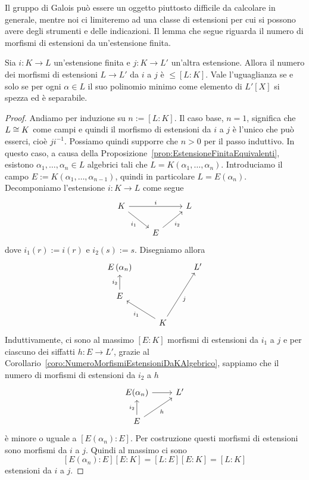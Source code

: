 Il gruppo di Galois può essere un oggetto piuttosto difficile da calcolare in generale, mentre noi ci limiteremo ad una classe di estensioni per cui si possono avere degli strumenti e delle indicazioni. Il lemma che segue riguarda il numero di morfismi di estensioni da un'estensione finita.

\begin{lemm}
Sia $i : K \to L$ un'estensione finita e $j : K \to L'$ un'altra estensione. Allora il numero dei morfismi di estensioni $L \to L'$ da $i$ a $j$ è $\le [L:K]$. Vale l'uguaglianza se e solo se per ogni $\alpha \in L$ il suo polinomio minimo come elemento di $L'[X]$ si spezza ed è separabile.
\end{lemm}

\begin{proof}
Andiamo per induzione su $n := [L:K]$. Il caso base, $n = 1$, significa che $L \cong K$ come campi e quindi il morfismo di estensioni da $i$ a $j$ è l'unico che può esserci, cioè $ji^{-1}$. Possiamo quindi supporre che $n > 0$ per il passo induttivo. In questo caso, a causa della Proposizione~\ref{prop:EstensioneFinitaEquivalenti}, esistono $\alpha_1, \dots{}, \alpha_n \in L$ algebrici tali che $L = K\left(\alpha_1, \dots{}, \alpha_n\right)$. Introduciamo il campo $E := K\left(\alpha_1, \dots{}, \alpha_{n-1}\right)$, quindi in particolare $L = E(\alpha_n)$. Decomponiamo l'estensione $i : K \to L$ come segue
\[\begin{tikzcd}
K \ar["i", rr] \ar["{i_1}", dr, swap] & & L \\
& E \ar["{i_2}", ur, swap]
\end{tikzcd}\]
dove $i_1(r) := i(r)$ e $i_2(s) := s$. Disegniamo allora
\[\begin{tikzcd}
E\left(\alpha_n\right) & & L' \\
E \ar["{i_2}", u] \\
& K \ar["{i_1}", ul] \ar["j", uur, swap]
\end{tikzcd}\]
Induttivamente, ci sono al massimo $[E:K]$ morfismi di estensioni da $i_1$ a $j$ e per ciascuno dei siffatti $h : E \to L'$, grazie al Corollario~\ref{coro:NumeroMorfismiEstensioniDaKAlgebrico}, sappiamo che il numero di morfismi di estensioni da $i_2$ a $h$
\[\begin{tikzcd}
E(\alpha_n) \ar[r] & L' \\
E \ar["{i_2}", u] \ar["h", ur, swap]
\end{tikzcd}\]
è minore o uguale a $\left[E\left(\alpha_n\right):E\right]$. Per costruzione questi morfismi di estensioni sono morfismi da $i$ a $j$. Quindi al massimo ci sono
\[[E(\alpha_n):E][E:K] = [L:E][E:K] = [L:K]\]
estensioni da $i$ a $j$. 
\end{proof}

